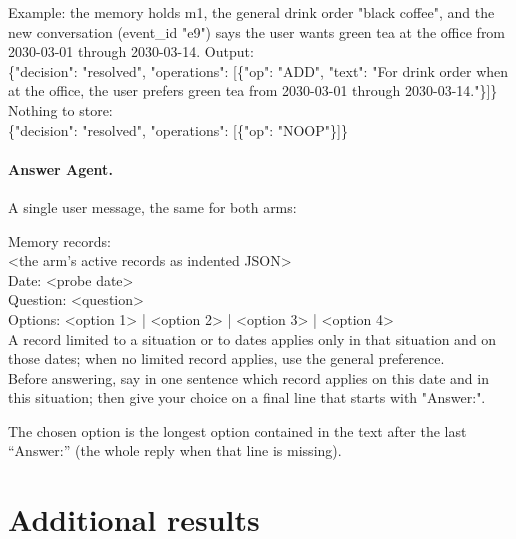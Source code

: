 \documentclass[11pt]{article}
\begin{document}
{Example: the memory holds m1, the general drink order "black coffee", and the new conversation (event\_id "e9") says the user wants green tea at the office from 2030-03-01 through 2030-03-14. Output:\\
\{"decision": "resolved", "operations": [\{"op": "ADD", "text": "For drink order when at the office, the user prefers green tea from 2030-03-01 through 2030-03-14."\}]\}\\
Nothing to store:\\
\{"decision": "resolved", "operations": [\{"op": "NOOP"\}]\}\par}

\paragraph{Answer Agent.} A single user message, the same for both arms:

{\scriptsize\ttfamily\raggedright
Memory records:\\
<the arm's active records as indented JSON>\\
Date: <probe date>\\
Question: <question>\\
Options: <option 1> | <option 2> | <option 3> | <option 4>\\
A record limited to a situation or to dates applies only in that situation and on those dates; when no limited record applies, use the general preference.\\
Before answering, say in one sentence which record applies on this date and in this situation; then give your choice on a final line that starts with "Answer:".\par}

\medskip
\noindent The chosen option is the longest option contained in the text after the last ``Answer:'' (the whole reply when that line is missing).

\section{Additional results}\label{app:extra}
\end{document}
